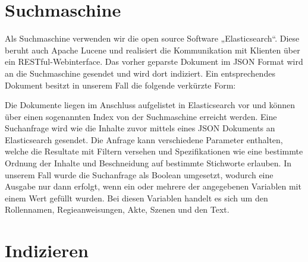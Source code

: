 \section{Suchmaschine}
Als Suchmaschine verwenden wir die open source Software „Elasticsearch“.
Diese beruht auch Apache Lucene
und realisiert die Kommunikation mit Klienten
über ein RESTful-Webinterface.
Das vorher geparste Dokument im JSON Format
wird an die Suchmaschine gesendet und wird dort indiziert.
Ein entsprechendes Dokument besitzt in unserem Fall
die folgende verkürzte Form:
% 

Die Dokumente liegen im Anschluss aufgelistet in Elasticsearch vor
und können über einen sogenannten Index von der Suchmaschine erreicht werden.
Eine Suchanfrage wird wie die Inhalte zuvor mittels eines JSON Dokuments
an Elasticsearch gesendet.
Die Anfrage kann verschiedene Parameter enthalten,
welche die Resultate mit Filtern versehen
und Spezifikationen wie eine bestimmte Ordnung der Inhalte
und Beschneidung auf bestimmte Stichworte erlauben.
In unserem Fall wurde die Suchanfrage als Boolean umgesetzt,
wodurch eine Ausgabe nur dann erfolgt,
wenn ein oder mehrere der angegebenen Variablen mit einem Wert gefüllt wurden. Bei diesen Variablen handelt es sich um den Rollennamen, Regieanweisungen, Akte, Szenen und den Text.

\section{Indizieren}

